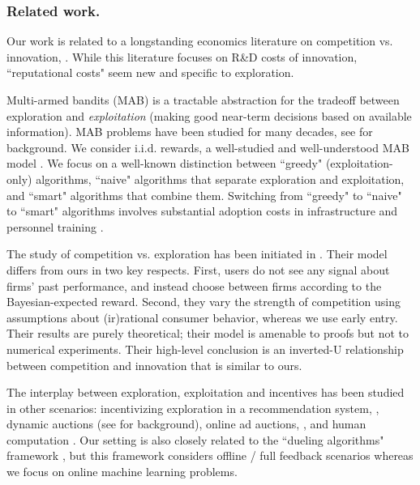 \documentclass[../competing_bandits.tex]{subfiles}
\begin{document}
\subsubsection{Related work.}
Our work is related to a longstanding economics literature on competition vs. innovation, \eg \cite{Schumpeter-42,barro2004economic,Aghion-QJE05}. While this literature focuses on R\&D costs of innovation, ``reputational costs" seem new and specific to exploration.

Multi-armed bandits (MAB) is a tractable abstraction for the tradeoff between exploration and \emph{exploitation} (making good near-term decisions based on available information). MAB problems have been studied for many decades, see \cite{Bubeck-survey12} for background. We consider i.i.d. rewards, a well-studied and well-understood MAB model \cite{bandits-ucb1}. We focus on a well-known distinction between ``greedy" (exploitation-only) algorithms, ``naive" algorithms that separate exploration and exploitation, and ``smart" algorithms that combine them. Switching from ``greedy" to ``naive" to ``smart" algorithms involves substantial adoption costs in infrastructure and personnel training \cite{MWT-WhitePaper-2016,DS-arxiv}.

The study of competition vs. exploration has been initiated in \cite{CompetingBandits-itcs16}. Their model differs from ours in two key respects. First, users do not see any signal about firms' past performance, and instead choose between firms according to the Bayesian-expected reward. Second, they vary the strength of competition using assumptions about (ir)rational consumer behavior, whereas we use early entry. Their results are purely theoretical; their model is amenable to proofs but not to numerical experiments. Their high-level conclusion is an inverted-U relationship between competition and innovation that is similar to ours.

The interplay between exploration, exploitation and incentives has been studied in other scenarios: incentivizing exploration in a recommendation system,
    \eg \cite{Kremer-JPE14,Frazier-ec14,Che-13,ICexploration-ec15,Bimpikis-exploration-ms17},
dynamic auctions
    (see \cite{DynAuctions-survey10} for background),
online ad auctions, \eg
    \cite{MechMAB-ec09,DevanurK09,NSV08,Transform-ec10-jacm,Amin-auctions-nips13},
and human computation
    \cite{RepeatedPA-ec14,Ghosh-itcs13,Krause-www13}.
Our setting is also closely related to the ``dueling algorithms" framework \cite{DuelingAlgs-stoc11}, but this framework considers offline / full feedback scenarios whereas we focus on online machine learning problems.
\end{document}
